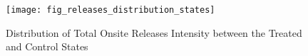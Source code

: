 \begin{figure}[H]
    \centering
    \texttt{[image: fig\_releases\_distribution\_states]}
    \caption{Distribution of Total Onsite Releases Intensity between the Treated and Control States}
    \label{fig:releases-distribution}
\end{figure}